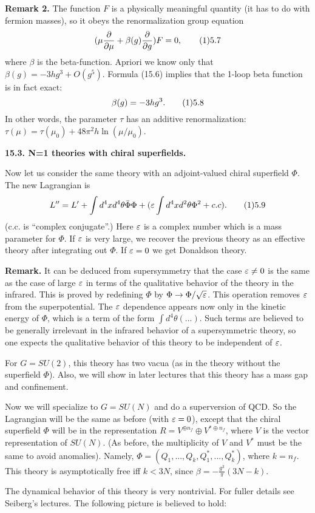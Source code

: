 {\bf Remark 2.}  The function $F$ is a
 physically meaningful quantity (it has to do with fermion masses), so 
it obeys the renormalization group equation 
$$
(\mu\frac{\d}{\d \mu}+\beta(g)\frac{\d}{\d g})F=0,\tag 15.7
$$
where $\beta$ is the beta-function. Apriori we know only that 
$\beta(g)=-3hg^3+O(g^5)$. Formula (15.6) implies that  
the 1-loop beta function is in fact exact:
$$
\beta(g)=-3hg^3.\tag 15.8
$$
In other words, the parameter $\tau$ has an additive renormalization:
$\tau(\mu)=\tau(\mu_0)+48\pi^2h\ln(\mu/\mu_0)$. 

{\bf 15.3. N=1 theories with chiral superfields.}

Now let us consider the same theory with an adjoint-valued chiral 
superfield $\Phi$. The new Lagrangian is 
$$
L''=L'+\int d^4xd^4\theta\bar\Phi\Phi+(\e\int d^4xd^2\theta \Phi^2+c.c).
\tag 15.9
$$
(c.c. is ``complex conjugate''.)
Here $\varepsilon$ is a complex number which is a mass parameter for $\Phi$. 
If $\varepsilon$ is very large, we recover the previous theory as an effective 
theory after integrating out $\Phi$. If $\varepsilon=0$ we get Donaldson theory. 

{\bf Remark.} It can be deduced from supersymmetry that the case $\varepsilon\ne 0$ 
is the same as the case of large $\varepsilon$ in terms of the qualitative behavior 
of the theory in the infrared. This is proved
by redefining $\Phi$ by $\Phi \to \Phi/\sqrt{\varepsilon}$.  This operation removes
$\varepsilon$ from the superpotential.  The $\varepsilon$ dependence appears now
only in the kinetic energy of $\Phi$, which is a term of the form 
$\int d^4 \theta
(...)$.   Such terms are believed to be generally irrelevant in the
infrared behavior of a supersymmetric theory, so one expects the qualitative
behavior of this theory to be independent of $\varepsilon$.

For $G=SU(2)$, this  theory has two vacua
(as in the theory without the superfield $\Phi$). Also, we will show 
in later lectures that this theory has a mass gap and confinement. 

Now we will specialize to $G=SU(N)$ and do a superversion of QCD. 
So the Lagrangian will be the same as before
(with $\varepsilon=0$), except that the chiral 
superfield $\Phi$ will be in the representation $R=V^{\oplus n_f}
\oplus V^{*\oplus n_f}$, where $V$ is the vector representation of $SU(N)$. 
(As before, the multiplicity of $V$ and $V^*$ must be the same to avoid 
anomalies). Namely, $\Phi=(Q_1,...,Q_k,Q_1^*,...,Q_k^*)$, where $k=n_f$. 
This theory is asymptotically free iff $k<3N$, since $\beta=-\frac{g^3}{\pi}
(3N-k)$. 

The dynamical behavior of this theory is very nontrivial.  
For fuller details see Seiberg's lectures.
The following picture is believed to hold:

